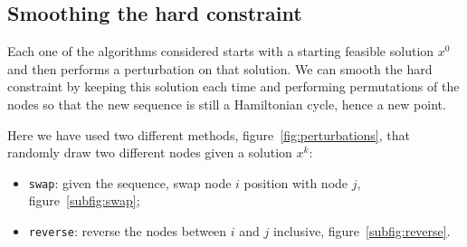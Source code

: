 \subsection{Smoothing the hard constraint}

Each one of the algorithms considered starts with a starting feasible solution $x^0$ and then performs a perturbation on that solution. We can smooth the hard constraint by keeping this solution each time and performing permutations of the nodes so that the new sequence is still a Hamiltonian cycle, hence a new point.

Here we have used two different methods, figure~\vref{fig:perturbations}, that randomly draw two different nodes given a solution $x^k$:
\begin{itemize}
	\item \texttt{swap}: given the sequence, swap node $i$ position with node $j$, figure~\ref{subfig:swap};
	\item \texttt{reverse}: reverse the nodes between $i$ and $j$ inclusive, figure~\ref{subfig:reverse}.
\end{itemize}


